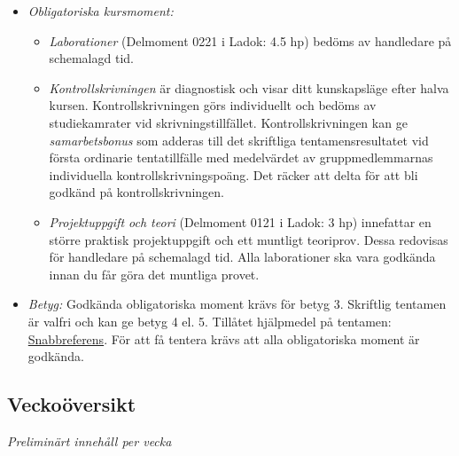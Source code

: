 \documentclass[a4paper,12pt,oneside]{memoir}
\begin{document}
\begin{itemize}
\item
  \emph{Obligatoriska kursmoment:}

  \begin{itemize}
  \item
    \emph{Laborationer} (Delmoment 0221 i Ladok: 4.5 hp) bedöms av handledare på schemalagd tid.
  \item
    \emph{Kontrollskrivningen} är diagnostisk och visar ditt kunskapsläge efter
    halva kursen. Kontrollskrivningen görs individuellt och bedöms
    av studiekamrater vid skrivningstillfället.
    Kontrollskrivningen kan ge \emph{samarbetsbonus} som adderas till
    det skriftliga tentamensresultatet vid första ordinarie
    tentatillfälle med medelvärdet av gruppmedlemmarnas individuella
    kontrollskrivningspoäng. Det räcker att delta för att bli godkänd på kontrollskrivningen.%
  \item
    \emph{Projektuppgift och teori} (Delmoment 0121 i Ladok: 3 hp) innefattar en större praktisk projektuppgift och ett muntligt teoriprov. Dessa redovisas för handledare på
    schemalagd tid. Alla laborationer ska vara godkända innan du får göra det muntliga provet.
  \end{itemize}

\item \emph{Betyg:} 
  Godkända obligatoriska moment krävs för betyg 3. Skriftlig tentamen är valfri och kan ge betyg 4 el. 5. Tillåtet hjälpmedel på tentamen:
  \href{http://cs.lth.se/pgk/quickref}{Snabbreferens}. 
  För att få tentera krävs att alla obligatoriska moment är godkända.\\
\end{itemize}

\clearpage

\subsection*{Veckoöversikt}

\resizebox{\columnwidth}{!}{%
{\fontsize{12pt}{20pt}\selectfont

}
}

\vspace{1.1em}\noindent\hspace*{-2.0mm}%
\noindent\textit{Preliminärt innehåll per vecka}\\~\\
\noindent\resizebox{\columnwidth}{!}
{%
{
\fontsize{5.0pt}{6.0pt}\selectfont
\begin{tabular}{l|l|p{7.4cm}}

\end{tabular}
}
}
\end{document}
